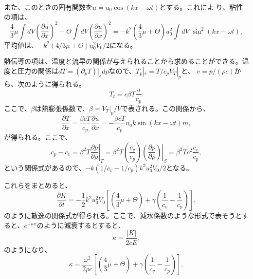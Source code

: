 また、このときの固有関数を$u = u_0 \cos (kx - \omega t)$とする。これによ
り、粘性の項は、
\[
   \frac{4}{3}\mu\int dV
  \left(\frac{\partial u}{\partial x}\right)^2 - 
  \Theta\int dV\left(\frac{\partial u}{\partial x}\right)^2
  = -k^2\left(\frac{4}{3}\mu + \Theta\right) u_0^2
  \int dV\mspace{5mu}\sin^2 (kx - \omega t),
\]
平均値は、$-k^2(4/3\mu + \Theta)u_0^2V_0/2$になる。

熱伝導の項は、温度と流早の関係が与えられることから求めることができる。温
度と圧力の関係は$dT=(\partial_pT)|_sdp$なので、$T_p|_s=T/c_pV_T|_p$と、
$v=p/(\rho c)$から、次のように得られる。
\[
 T_t = c\beta T\frac{u}{c_p}.
\]
ここで、$\beta$は熱膨張係数で、$\beta =V_T|_p/V$で表される。この関係から、
\[
 \frac{\partial T}{\partial x} 
 = \frac{\beta c T}{c_p}\frac{\partial u}{\partial x}
 = -\frac{\beta c T}{c_p}u_0k\sin(kx - \omega t)m,
\]
が得られる。ここで、
\[
 c_p - c_v 
 = \beta^2 T \left.\frac{\partial p}{\partial\rho}\right|_T
 = \beta^2 T \left(\frac{c_v}{c_p}\right)
 \left.\left(\frac{\partial p}{\partial \rho}\right)\right|_S
 = \beta^2Tc^2\frac{c_v}{c_p},
\]
という関係式があるので、$-k(1/c_v-1/c_p)k^2u_0^2V_0/2$となる。

これらをまとめると、
\begin{equation}
 \frac{\partial K}{\partial t}
  = -\frac{1}{2}k^2u_0^2V_0
  \left[\left(\frac{4}{3}\mu + \Theta\right)
  + \gamma\left(\frac{1}{c_v}-\frac{1}{c_p}\right)\right],
\end{equation}
のように散逸の関係式が得られる。ここで、減水係数のような形式で表そうとす
ると、$e^{-\kappa x}$のように減衰するとすると、
\begin{equation}
 \kappa = \frac{\left| K \right|}{2cE},
\end{equation}
のようになり、
\begin{equation}
 \kappa = \frac{\omega^2}{2\rho c}
  \left[\left(\frac{4}{3}\mu + \Theta\right)
  + \gamma\left(\frac{1}{c_v}-\frac{1}{c_p}\right)\right],
\end{equation}


